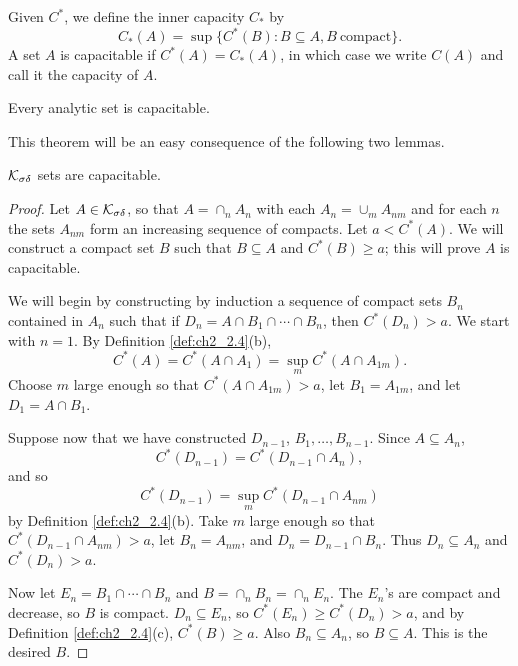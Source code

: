 Given $C^*$, we define the inner capacity $C_*$ by
\[
    C_*(A) = \sup\{C^*(B) : B \subseteq A, B~\text{compact}\}.
\]
A set $A$ is capacitable if $C^*(A) = C_*(A)$, in which case we write $C(A)$ and call it the capacity of $A$.

\begin{theorem}\label{thm:ch2_2.5}
Every analytic set is capacitable.
\end{theorem}

This theorem will be an easy consequence of the following two lemmas.

\begin{lemma}\label{lem:ch2_2.6}
$\mathcal{K}_{\sigma\delta}$ sets are capacitable.
\end{lemma}

\begin{proof}
Let $A \in \mathcal{K}_{\sigma\delta}$, so that $A = \cap_n A_n$ with each $A_n = \cup_m A_{nm}$ and for each $n$ the sets $A_{nm}$ form an increasing sequence of compacts. Let $a < \allowbreak C^*(A)$. We will construct a compact set $B$ such that $B \subseteq A$ and $C^*(B) \geq a$; this will prove $A$ is capacitable.

We will begin by constructing by induction a sequence of compact sets $B_n$ contained in $A_n$ such that if $D_n = A \cap B_1 \cap \cdots \cap B_n$, then $C^*(D_n) > a$. We start with $n = 1$. By Definition \ref{def:ch2_2.4}(b),
\[
    C^*(A) = C^*(A \cap A_1) = \sup_m C^*(A \cap A_{1m}).
\]
Choose $m$ large enough so that $C^*(A \cap A_{1m}) > a$, let $B_1 = A_{1m}$, and let $D_1 = A \cap B_1$.

Suppose now that we have constructed $D_{n-1}$, $B_1,\ldots,B_{n-1}$. Since $A \subseteq \allowbreak A_n$,
\[
    C^*(D_{n-1}) = C^*(D_{n-1} \cap A_n),
\]
and so
\[
    C^*(D_{n-1}) = \sup_m C^*(D_{n-1} \cap A_{nm})
\]
by Definition \ref{def:ch2_2.4}(b). Take $m$ large enough so that $C^*(D_{n-1} \cap A_{nm}) > a$, let $B_n = A_{nm}$, and $D_n = D_{n-1} \cap B_n$. Thus $D_n \subseteq A_n$ and $C^*(D_n) > a$.


Now let $E_n = B_1 \cap \cdots \cap B_n$ and $B = \cap_n B_n = \cap_n E_n$. The $E_n$'s are compact and decrease, so $B$ is compact. $D_n \subseteq E_n$, so $C^*(E_n) \geq C^*(D_n) > a$, and by Definition \ref{def:ch2_2.4}(c), $C^*(B) \geq a$. Also $B_n \subseteq A_n$, so $B \subseteq A$. This is the desired $B$.
\end{proof}

